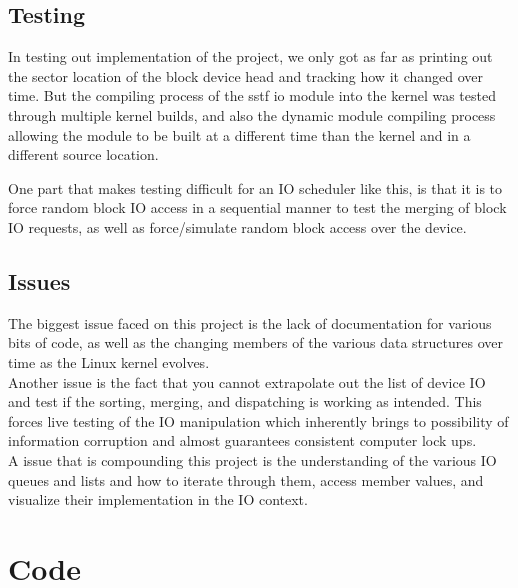 \documentclass[letterpaper,10pt,titlepage]{article}
\begin{document}
\subsection*{Testing} 

In testing out implementation of the project, we only got as far as printing out the sector location of the block device head and tracking how it changed over time. But the compiling process of the sstf io module into the kernel was tested through multiple kernel builds, and also the dynamic module compiling process allowing the module to be built at a different time than the kernel and in a different source location.

One part that makes testing difficult for an IO scheduler like this, is that it is to force random block IO access in a sequential manner to test the merging of block IO requests, as well as force/simulate random block access over the device.

\subsection*{Issues}

The biggest issue faced on this project is the lack of documentation for various bits of code, as well as the changing members of the various data structures over time as the Linux kernel evolves. \\

Another issue is the fact that you cannot extrapolate out the list of device IO and test if the sorting, merging, and dispatching is working as intended. This forces live testing of the IO manipulation which inherently brings to possibility of information corruption and almost guarantees consistent computer lock ups.\\

A issue that is compounding this project is the understanding of the various IO queues and lists and how to iterate through them, access member values, and visualize their implementation in the IO context.

\section{Code}
\label{Implementation Specific Code}

\end{document}
